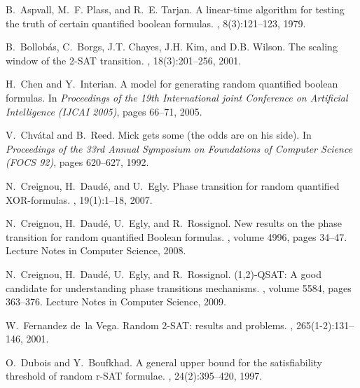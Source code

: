 \documentclass[aop,noinfoline]{imsart}
\begin{document}
\begin{thebibliography}{10}

B.~Aspvall, M.~F. Plass, and R.~E. Tarjan.
\newblock A linear-time algorithm for testing the truth of certain quantified
  boolean formulas.
, 8(3):121--123, 1979.

B.~Bollob{\'a}s, C.~Borgs, J.T. Chayes, J.H. Kim, and D.B. Wilson.
\newblock The scaling window of the 2-{SAT} transition.
, 18(3):201--256, 2001.

H.~Chen and Y.~Interian.
\newblock A model for generating random quantified boolean formulas.
\newblock In {\em Proceedings of the 19th International joint Conference on
  Artificial Intelligence (IJCAI 2005)}, pages 66--71, 2005.

V.~Chv\'atal and B.~Reed.
\newblock Mick gets some (the odds are on his side).
\newblock In {\em Proceedings of the 33rd Annual Symposium on Foundations of
  Computer Science (FOCS 92)}, pages 620--627, 1992.

N.~Creignou, H.~Daud\'e, and U.~Egly.
\newblock Phase transition for random quantified {XOR}-formulas.
, 19(1):1--18, 2007.

N.~Creignou, H.~Daud\'e, U.~Egly, and R.~Rossignol.
\newblock New results on the phase transition for random quantified {B}oolean
  formulas.
, volume 4996, pages 34--47. Lecture Notes in Computer Science,
  2008.

N.~Creignou, H.~Daud\'e, U.~Egly, and R.~Rossignol.
\newblock (1,2)-{QSAT}: A good candidate for understanding phase transitions
  mechanisms.
, volume 5584, pages 363--376. Lecture Notes in Computer Science,
  2009.

W.~Fernandez de~la Vega.
\newblock Random 2-{SAT}: results and problems.
, 265(1-2):131--146, 2001.

O.~Dubois and Y.~Boufkhad.
\newblock A general upper bound for the satisfiability threshold of random
  r-{SAT} formulae.
, 24(2):395--420, 1997.


\end{thebibliography}
\end{document}
